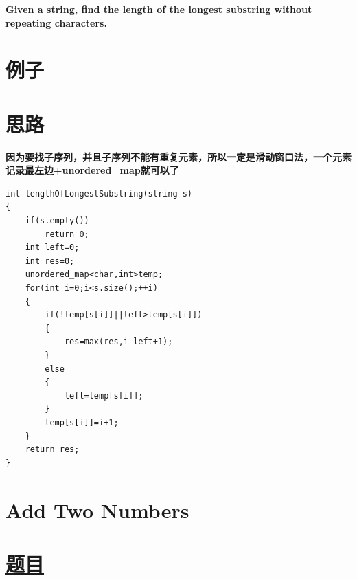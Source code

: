 \documentclass[a4paper, 11pt]{article} %
\begin{document}
\begin{spacing}{1.5}
{{  \textbf{Given a string, find the length of the longest substring without repeating characters.}

  }
  }
  \section*{例子}

\section*{思路}
\textbf{\color{blue}因为要找子序列，并且子序列不能有重复元素，所以一定是滑动窗口法，一个元素记录最左边+unordered\_map就可以了}
\begin{lstlisting}[caption={},frame=shadowbox]
    int lengthOfLongestSubstring(string s)
{
    if(s.empty())
        return 0;
    int left=0;
    int res=0;
    unordered_map<char,int>temp;
    for(int i=0;i<s.size();++i)
    {
        if(!temp[s[i]]||left>temp[s[i]])
        {
            res=max(res,i-left+1);
        }
        else
        {
            left=temp[s[i]];
        }
        temp[s[i]]=i+1;
    }
    return res;
}
\end{lstlisting}






\section{Add Two Numbers}
\section*{\href{https://leetcode.com/problems/add-two-numbers/}{题目} }
\fbox{%
  \parbox{\textwidth}{%

}}
\end{spacing}
\end{document}
